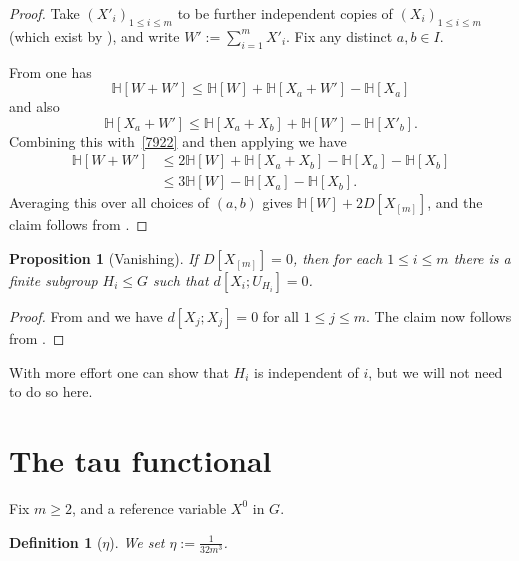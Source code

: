 \documentclass[10pt,a4paper]{article}
\newtheorem{proposition}[theorem]{Proposition}
\newtheorem{definition}[theorem]{Definition}
\newcommand{\lean}[1]{}
\newcommand{\uses}[1]{}
\newcommand{\leanok}{}
\newcommand{\bbH}{\mathbb{H}}
\begin{document}
\begin{proof}\uses{independent-exist, kv, sumset-lower, ruz-indep, multidist-indep}\leanok
  Take $(X'_i)_{1 \leq i \leq m}$ to be further independent copies of $(X_i)_{1 \leq i \leq m}$ (which exist by ), and write $W' := \sum_{i=1}^m X'_i$.
  Fix any distinct $a,b \in I$.

  From  one has
  \begin{equation}\label{7922}
    \bbH[W + W'] \leq  \bbH[W] + \bbH[X_{a} + W'] - \bbH[X_{a}]
   \end{equation}
   and also
   \[ \bbH[X_a + W'] \leq \bbH[X_a + X_b] + \bbH[W'] - \bbH[X'_b].\]
   Combining this with~\eqref{7922} and then applying  we have
   \begin{align*}  \bbH[W + W']  & \leq    2\bbH[W] + \bbH[X_a + X_b]  - \bbH[X_a] - \bbH[X_b] \\ & \leq
    3 \bbH[W] - \bbH[X_a] - \bbH[X_b].
  \end{align*}
  Averaging this over all choices of $(a,b)$ gives $\bbH[W] + 2 D[X_{[m]}]$, and the claim follows from .
\end{proof}

\begin{proposition}[Vanishing]\label{multi-zero}\lean{multidist_eq_zero}\uses{multidist-def}\leanok
If $D[X_{[m]}]=0$, then for each $1 \leq i \leq m$ there is a finite subgroup $H_i \leq G$ such that $d[X_i; U_{H_i}] = 0$.
\end{proposition}

\begin{proof}\uses{multidist-ruzsa-I, ruzsa-nonneg, lem:100pc}\leanok  From  and  we have $d[X_j; X_j]=0$ for all $1 \leq j \leq m$.  The claim now follows from .
\end{proof}

With more effort one can show that $H_i$ is independent of $i$, but we will not need to do so here.

\section{The tau functional}

Fix $m \geq 2$, and a reference variable $X^0$ in $G$.

\begin{definition}[$\eta$]\label{eta-def-multi}\lean{multiRefPackage}\leanok
We set $\eta := \frac{1}{32m^3}$.
\end{definition}
\end{document}
